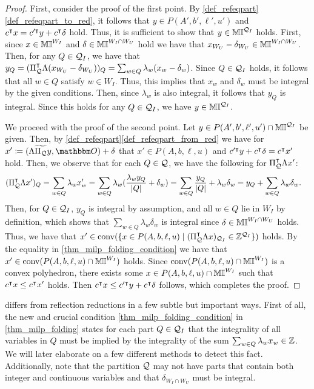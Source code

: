 \documentclass[pdflatex,sn-mathphys-num]{sn-jnl}%
\theoremstyle{thmstyleone}%
\theoremstyle{thmstylethree}%
\theoremstyle{thmstyletwo}%
\newcommand{\conv}{\mathrm{conv}}
\begin{document}
\begin{proof}
    First, consider the proof of the first point. By \cref{def_refeqpart}\ref{def_refeqpart_to_red}, it follows that $y\in P(A',b',\ell',u')$ and $c^{\intercal} x = c'^{\intercal} y + c^{\intercal} \delta$ hold. Thus, it is sufficient to show that $y\in \mathbb{MI}^{\mathcal{Q}_I}$ holds. First, since $x\in \mathbb{MI}^{W_I}$ and $\delta\in \mathbb{MI}^{W_I\cap W_U}$ hold we have that $x_{W_U} - \delta_{W_U} \in \mathbb{MI}^{W_I\cap W_U}$. Then, for any $Q\in \mathcal{Q}_I$, we have that $y_Q = (\Pi_{\mathcal{Q}}^{\intercal} \Lambda (x_{W_U} - \delta_{W_U}))_Q = \sum_{w\in Q} \lambda_w (x_w - \delta_w)$. Since $Q\in \mathcal{Q}_I$ holds, it follows that all $w\in Q$ satisfy $w\in W_I$. Thus, this implies that $x_w$ and $\delta_w$ must be integral by the given conditions. Then, since $\lambda_w$ is also integral, it follows that $y_Q$ is integral. Since this holds for any $Q\in \mathcal{Q}_I$, we have $y\in \mathbb{MI}^{\mathcal{Q}_I}$.

    We proceed with the proof of the second point. Let $y\in P(A',b',\ell',u')\cap \mathbb{MI}^{\mathcal{Q}_I}$ be given. Then, by \cref{def_refeqpart}\ref{def_refeqpart_from_red} we have for $x' \coloneqq (\Lambda \widetilde{\Pi_\MQ} y, \zerovec) + \delta$ that $x'\in P(A,b,\ell,u)$ and $c'^{\intercal} y +c^{\intercal} \delta = c^{\intercal} x'$ hold. 
    Then, we observe that for each $Q\in \mathcal{Q}$, we have the following for $\Pi_{\mathcal{Q}}^{\intercal} \Lambda x'$: 
    \begin{align*}
        (\Pi_{\mathcal{Q}}^{\intercal} \Lambda x')_Q = \sum_{w\in Q} \lambda_w x'_w &= \sum_{w\in Q} \lambda_w (\frac{\lambda_w y_Q}{|Q|} + \delta_w) = \sum_{w\in Q} \frac{y_Q}{|Q|} + \lambda_w \delta_w = y_Q + \sum_{w\in Q} \lambda_w \delta_w.
    \end{align*}
    Then, for $Q\in \mathcal{Q}_I$, $y_Q$ is integral by assumption, and all $w\in Q$ lie in $W_I$ by definition, which shows that $\sum_{w\in Q} \lambda_w \delta_w$ is integral since $\delta\in \mathbb{MI}^{W_I\cap W_U}$ holds. Thus, we have that $x'\in \conv(\{x\in P(A,b,\ell,u) \mid (\transpose{\Pi_{\MQ}} \Lambda x)_{\MQ_I} \in \Z^{\MQ_I}\})$ holds. By the equality in \eqref{thm_milp_folding_condition} we have that $x'\in \conv(P(A,b,\ell,u)\cap \M^{W_I})$ holds. Since $\conv(P(A,b,\ell,u)\cap \M^{W_I})$ is a convex polyhedron, there exists some $x\in P(A,b,\ell,u)\cap \mathbb{MI}^{W_I}$ such that $c^{\intercal} x \leq c^{\intercal} x'$ holds. Then $c^{\intercal} x \leq c'^{\intercal} y +c^{\intercal} \delta$ follows, which completes the proof.
\end{proof}

 differs from reflection reductions in a few subtle but important ways. First of all, the new and crucial condition \eqref{thm_milp_folding_condition} in \cref{thm_milp_folding} states for each part $Q\in \mathcal{Q}_I$ that the integrality of all variables in $Q$ must be implied by the integrality of the sum $\sum_{w\in Q} \lambda_w x_w \in \mathbb{Z}$. We will later elaborate on a few different methods to detect this fact. 
Additionally, note that the partition $\mathcal{Q}$ may not have parts that contain both integer and continuous variables and that $\delta_{W_I\cap W_U}$ must be integral.
\end{document}
